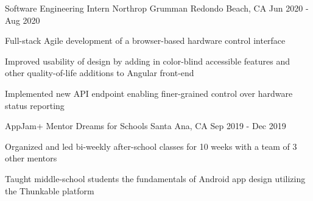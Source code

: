 
\begin{cventries}
	\cventry
	{Software Engineering Intern}
	{Northrop Grumman}
	{Redondo Beach, CA}
	{Jun 2020 - Aug 2020}
	{
		\begin{cvitems}
			\item{Full-stack Agile development of a browser-based hardware control interface}
			\item{Improved usability of design by adding in color-blind accessible features and other quality-of-life additions to Angular front-end}
			\item{Implemented new API endpoint enabling finer-grained control over hardware status reporting}
		\end{cvitems}
	}

	\cventry
	{AppJam+ Mentor}
	{Dreams for Schools}
	{Santa Ana, CA}
	{Sep 2019 - Dec 2019}
	{
	\begin{cvitems}
		\item{Organized and led bi-weekly after-school classes for 10 weeks with a team of 3 other mentors}
		\item{Taught middle-school students the fundamentals of Android app design utilizing the Thunkable platform}
	\end{cvitems}
	}
\end{cventries}
